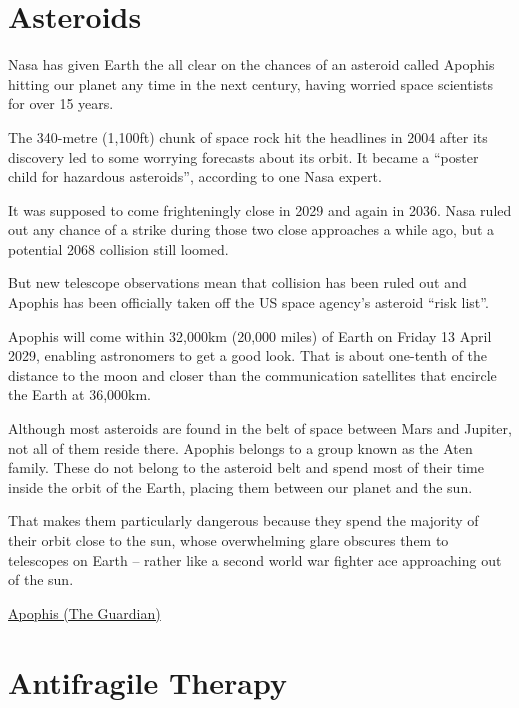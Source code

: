\documentclass[
]{book}
\begin{document}
\hypertarget{asteroids}{%
\chapter{Asteroids}\label{asteroids}}

Nasa has given Earth the all clear on the chances of an asteroid called Apophis hitting our planet any time in the next century, having worried space scientists for over 15 years.

The 340-metre (1,100ft) chunk of space rock hit the headlines in 2004 after its discovery led to some worrying forecasts about its orbit. It became a ``poster child for hazardous asteroids'', according to one Nasa expert.

It was supposed to come frighteningly close in 2029 and again in 2036. Nasa ruled out any chance of a strike during those two close approaches a while ago, but a potential 2068 collision still loomed.

But new telescope observations mean that collision has been ruled out and Apophis has been officially taken off the US space agency's asteroid ``risk list''.

Apophis will come within 32,000km (20,000 miles) of
Earth on Friday 13 April 2029, enabling astronomers to get a good look. That is about one-tenth of the distance to the moon and closer than the communication satellites that encircle the Earth at 36,000km.

Although most asteroids are found in the belt of space between Mars and Jupiter, not all of them reside there. Apophis belongs to a group known as the Aten family. These do not belong to the asteroid belt and spend most of their time inside the orbit of the Earth, placing them between our planet and the sun.

That makes them particularly dangerous because they spend the majority of their orbit close to the sun, whose overwhelming glare obscures them to telescopes on Earth -- rather like a second world war fighter ace approaching out of the sun.

\href{https://www.theguardian.com/science/2021/mar/27/much-feared-asteroid-apophis-wont-hit-earth-for-at-least-100-years-nasa-says}{Apophis (The Guardian)}

\hypertarget{antifragile-therapy}{%
\chapter{Antifragile Therapy}\label{antifragile-therapy}}
\end{document}
